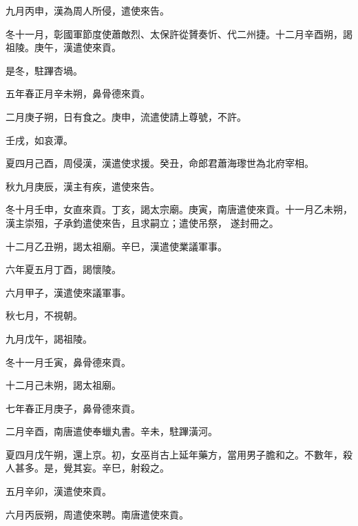 \begin{pinyinscope}
 九月丙申，漢為周人所侵，遣使來告。



 冬十一月，彰國軍節度使蕭敵烈、太保許從贇奏忻、代二州捷。十二月辛酉朔，謁祖陵。庚午，漢遣使來貢。



 是冬，駐蹕杏堝。



 五年春正月辛未朔，鼻骨德來貢。



 二月庚子朔，日有食之。庚申，流遣使請上尊號，不許。



 壬戌，如哀潭。



 夏四月己酉，周侵漢，漢遣使求援。癸丑，命郎君蕭海瓈世為北府宰相。



 秋九月庚辰，漢主有疾，遣使來告。



 冬十月壬申，女直來貢。丁亥，謁太宗廟。庚寅，南唐遣使來貢。十一月乙未朔，漢主崇殂，子承鈞遣使來告，且求嗣立；遣使吊祭，
 遂封冊之。



 十二月乙丑朔，謁太祖廟。辛巳，漢遣使業議軍事。



 六年夏五月丁酉，謁懷陵。



 六月甲子，漢遣使來議軍事。



 秋七月，不視朝。



 九月戊午，謁祖陵。



 冬十一月壬寅，鼻骨德來貢。



 十二月己未朔，謁太祖廟。



 七年春正月庚子，鼻骨德來貢。



 二月辛酉，南唐遣使奉蠟丸書。辛未，駐蹕潢河。



 夏四月戊午朔，還上京。初，女巫肖古上延年藥方，當用男子膽和之。不數年，殺人甚多。是，覺其妄。辛巳，射殺之。



 五月辛卯，漢遣使來貢。



 六月丙辰朔，周遣使來聘。南唐遣使來貢。




\end{pinyinscope}
